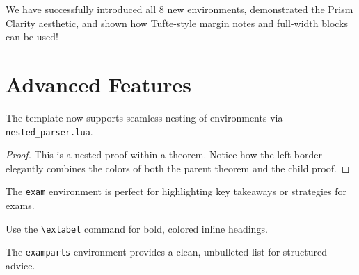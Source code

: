 \documentclass[12pt, letterpaper, twoside]{book}
\begin{document}
\begin{summary}
  We have successfully introduced all 8 new environments, demonstrated the Prism Clarity aesthetic, and shown how Tufte-style margin notes and full-width blocks can be used!
\end{summary}

\section{Advanced Features}

\begin{theorem}
  The template now supports seamless nesting of environments via \texttt{nested\_parser.lua}.
  \begin{proof}
    This is a nested proof within a theorem. Notice how the left border elegantly combines the colors of both the parent theorem and the child proof.
  \end{proof}
\end{theorem}

\begin{exam}
   The \texttt{exam} environment is perfect for highlighting key takeaways or strategies for exams.
  \begin{examparts}
    \item Use the \verb|\exlabel| command for bold, colored inline headings.
    \item The \texttt{examparts} environment provides a clean, unbulleted list for structured advice.
  \end{examparts}
\end{exam}


\clearpage
\end{document}
